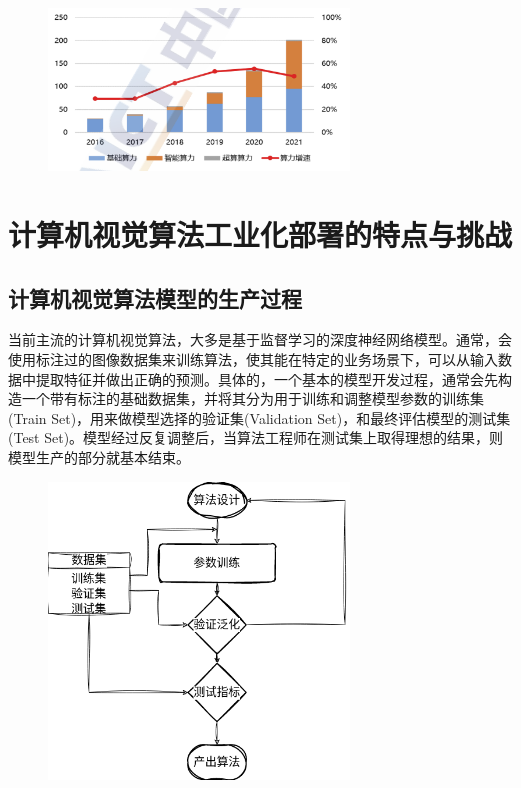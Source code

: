 \documentclass[master,anonymous]{shtthesis}
\begin{document}
\begin{figure}[htbp]
	\centering
	\includegraphics[width=8cm]{img/1.png}
	\label{2022年中国算力发展状况}
\end{figure}

\section{计算机视觉算法工业化部署的特点与挑战}\label{计算机视觉算法工业化部署的特点与挑战}
\subsection{计算机视觉算法模型的生产过程}
当前主流的计算机视觉算法，大多是基于监督学习的深度神经网络模型。通常，会使用标注过的图像数据集来训练算法，使其能在特定的业务场景下，可以从输入数据中提取特征并做出正确的预测。具体的，一个基本的模型开发过程，通常会先构造一个带有标注的基础数据集，并将其分为用于训练和调整模型参数的训练集(Train Set)，用来做模型选择的验证集(Validation Set)，和最终评估模型的测试集(Test Set)。模型经过反复调整后，当算法工程师在测试集上取得理想的结果，则模型生产的部分就基本结束。

\begin{figure}[htbp]
	\centering
	\includegraphics[width=8cm]{img/2.png}
	\label{计算机视觉算法模型的生产过程}
\end{figure}
\end{document}
